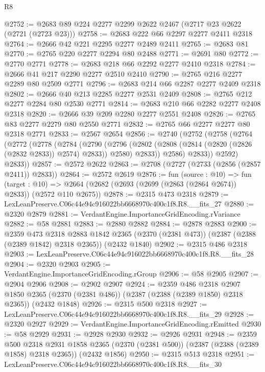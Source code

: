 \begin{lexlean}{R8}
\begin{coremodule}
@2752 := @2683 @89 @224 @2277 @2299 @2622 @2467 (@2717 @23 @2622 (@2721 (@2723 @23)))
@2758 := @2683 @222 @66 @2297 @2277 @2411 @2318
@2764 := @2666 @42 @221 @2295 @2277 @2489 @2411
@2765 := @2683 @81
@2770 := @2765 @220 @2277 @2294 @80 @2488
@2771 := @2691 @80
@2772 := @2770 @2771
@2778 := @2683 @218 @66 @2292 @2277 @2410 @2318
@2784 := @2666 @41 @217 @2290 @2277 @2510 @2410
@2790 := @2765 @216 @2277 @2289 @80 @2509 @2771
@2796 := @2683 @214 @66 @2287 @2277 @2409 @2318
@2802 := @2666 @40 @213 @2285 @2277 @2531 @2409
@2808 := @2765 @212 @2277 @2284 @80 @2530 @2771
@2814 := @2683 @210 @66 @2282 @2277 @2408 @2318
@2820 := @2666 @39 @209 @2280 @2277 @2551 @2408
@2826 := @2765 @83 @2277 @2279 @80 @2550 @2771
@2832 := @2765 @66 @2277 @2277 @80 @2318 @2771
@2833 := @2567 @2654
@2856 := @2740
    (@2752
      (@2758
        (@2764
          (@2772
            (@2778
              (@2784
                (@2790
                  (@2796
                    (@2802 (@2808 (@2814 (@2820 (@2826 (@2832 @2833)) @2574) @2833)) @2580)
                    @2833))
                @2586)
              @2833))
          @2592)
        @2833))
@2857 := @2572 @2622
@2863 := @2708 (@2727 (@2733 (@2856 (@2857 @2411)) @2833))
@2864 := @2572 @2619
@2876 := fun (source : @10) =>
  fun (target : @10) => @2664 (@2682 (@2693 (@2699 (@2863 (@2864 @2674)) @2833)) (@2572 @110 @2675))
@2878 := @2315 @473 @2318
@2879 := LexLeanPreserve.C06c44e94c916022bb6668970c400c1f8.R8.__fits_27
@2880 := @2320 @2879
@2881 := VerdantEngine.ImportanceGridEncoding.rVariance
@2882 := @58 @2881
@2883 := @2880 @2882
@2884 := @2878 @2883
@2900 := @2359
    @473
    @2318
    @2883
    @1842
    @2365
    (@2370 (@2381 @473))
    (@2387 (@2388 (@2389 @1842) @2318 @2365))
    (@2432 @1840)
@2902 := @2315 @486 @2318
@2903 := LexLeanPreserve.C06c44e94c916022bb6668970c400c1f8.R8.__fits_28
@2904 := @2320 @2903
@2905 := VerdantEngine.ImportanceGridEncoding.rGroup
@2906 := @58 @2905
@2907 := @2904 @2906
@2908 := @2902 @2907
@2924 := @2359
    @486
    @2318
    @2907
    @1850
    @2365
    (@2370 (@2381 @486))
    (@2387 (@2388 (@2389 @1850) @2318 @2365))
    (@2432 @1848)
@2926 := @2315 @500 @2318
@2927 := LexLeanPreserve.C06c44e94c916022bb6668970c400c1f8.R8.__fits_29
@2928 := @2320 @2927
@2929 := VerdantEngine.ImportanceGridEncoding.rEmitted
@2930 := @58 @2929
@2931 := @2928 @2930
@2932 := @2926 @2931
@2948 := @2359
    @500
    @2318
    @2931
    @1858
    @2365
    (@2370 (@2381 @500))
    (@2387 (@2388 (@2389 @1858) @2318 @2365))
    (@2432 @1856)
@2950 := @2315 @513 @2318
@2951 := LexLeanPreserve.C06c44e94c916022bb6668970c400c1f8.R8.__fits_30

\end{coremodule}
\end{lexlean}
